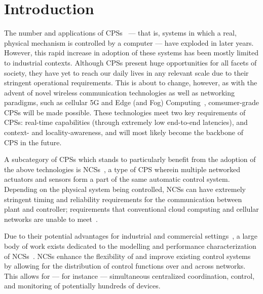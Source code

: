 \section{Introduction}\label{sec:intro}


The number and applications of \acp{CPS}~\cite{Rajkumar2010CPS} --- that is, systems in which a real, physical mechanism is controlled by a computer --- have exploded in later years.
However, this rapid increase in adoption of these systems has been mostly limited to industrial contexts.
Although \acp{CPS} present huge opportunities for all facets of society, they have yet to reach our daily lives in any relevant scale due to their stringent operational requirements.
This is about to change, however, as with the advent of novel wireless communication technologies as well as networking paradigms, such as cellular 5G and Edge (and Fog) Computing~\cite{Satya2009Case,Satya2017Emergence}, comsumer-grade \acp{CPS} will be made possible.
These technologies meet two key requirements of \acp{CPS}: real-time capabilities (through extremely low end-to-end latencies), and context- and locality-awareness, and will most likely become the backbone of \ac{CPS} in the future.

A subcategory of \acp{CPS} which stands to particularly benefit from the adoption of the above technologies is \acp{NCS}~\cite{Gupta2010NCSOverview}, a type of \ac{CPS} wherein multiple networked actuators and sensors form a part of the same automatic control system.
Depending on the physical system being controlled, \acp{NCS} can have extremely stringent timing and reliability requirements for the communication between plant and controller; requirements that conventional cloud computing and cellular networks are unable to meet~\cite{Liu2017Review,Wan2020Efficient}.

Due to their potential advantages for industrial and commercial settings~\cite{Lu2015WSAN}, a large body of work exists dedicated to the modelling and performance characterization of \aclp{NCS}~\cite{Hespanha2007Survey,Zhang2013Survey,Zhang2016Survey}.
\Acp{NCS} enhance the flexibility of and improve existing control systems by allowing for the distribution of control functions over and across networks.
This allows for --- for instance --- simultaneous centralized coordination, control, and monitoring of potentially hundreds of devices.

